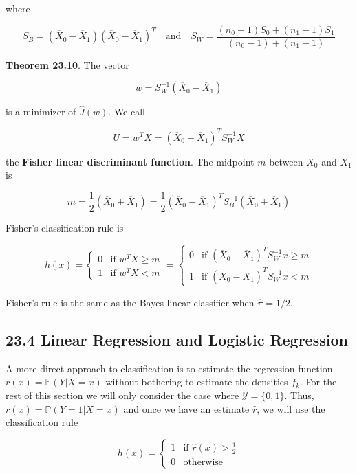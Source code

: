 where

\[ 
S_B = (\overline{X}_{0} - \overline{X}_{1}) (\overline{X}_{0} - \overline{X}_{1})^T
\quad \text{and} \quad
S_W = \frac{(n_{0} - 1) S_{0} + (n_{1} - 1) S_{1}}{(n_{0} - 1) + (n_{1} -1)}
\]

\textbf{Theorem 23.10}. The vector

\[ w = S_W^{-1}(\overline{X}_{0} - \overline{X}_{1}) \]

is a minimizer of \(\hat{J}(w)\). We call

\[ U = w^T X = (\overline{X}_{0} - \overline{X}_{1})^T S_W^{-1} X \]

the \textbf{Fisher linear discriminant function}. The midpoint \(m\)
between \(\overline{X}_{0}\) and \(\overline{X}_{1}\) is

\[ m = \frac{1}{2} (\overline{X}_{0} + \overline{X}_{1}) = \frac{1}{2}  (\overline{X}_{0} - \overline{X}_{1})^T S_B^{-1}  (\overline{X}_{0} + \overline{X}_{1})\]

Fisher's classification rule is

\[
h(x) = \begin{cases}
0 & \text{if } w^T X \geq m \\
1 & \text{if } w^T X < m
\end{cases}
= \begin{cases}
0 & \text{if } (\overline{X}_{0} - \overline{X}_{1})^T S_W^{-1}x \geq m \\
1 & \text{if } (\overline{X}_{0} - \overline{X}_{1})^T S_W^{-1}x < m
\end{cases}
\]

Fisher's rule is the same as the Bayes linear classifier when
\(\hat{\pi} = 1/2\).

\subsection*{23.4 Linear Regression and Logistic Regression}\label{linear-regression-and-logistic-regression}

A more direct approach to classification is to estimate the regression
function \(r(x) = \mathbb{E}(Y | X = x)\) without bothering to estimate
the densities \(f_{k}\). For the rest of this section we will only
consider the case where \(\mathcal{Y} = \{ 0, 1 \}\). Thus,
\(r(x) = \mathbb{P}(Y = 1 | X = x)\) and once we have an estimate
\(\hat{r}\), we will use the classification rule

\[ 
h(x) = \begin{cases}
1 &\text{if } \hat{r}(x) > \frac{1}{2} \\
0 &\text{otherwise}
\end{cases} 
\]

